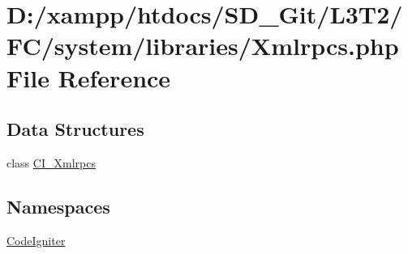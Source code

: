 \hypertarget{_xmlrpcs_8php}{}\section{D\+:/xampp/htdocs/\+S\+D\+\_\+\+Git/\+L3\+T2/\+F\+C/system/libraries/\+Xmlrpcs.php File Reference}
\label{_xmlrpcs_8php}
\subsection*{Data Structures}
\begin{DoxyCompactItemize}
\item 
class \hyperlink{class_c_i___xmlrpcs}{C\+I\+\_\+\+Xmlrpcs}
\end{DoxyCompactItemize}
\subsection*{Namespaces}
\begin{DoxyCompactItemize}
\item 
 \hyperlink{namespace_code_igniter}{Code\+Igniter}
\end{DoxyCompactItemize}

